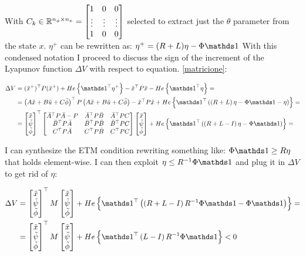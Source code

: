 \documentclass{article}
\begin{document}
With $C_{k} \in {\mathbb{R}}^{n_{\phi} \times n_{x}} = \left[\begin{matrix}
  1 & 0 & 0 \\
  \vdots & \vdots & \vdots \\
  1 & 0 & 0 
\end{matrix}\right]$ selected to extract just the $\theta$ parameter from the state $x$.
$\eta^{+}$ can be rewritten as: $\eta^{+} = (R + L) \eta - \Phi \one$
With this condensed notation I proceed to discuss the sign of the increment of the Lyapunov function $\Delta V$ with respect to equation. \ref{matricione}:

\begin{align*}
  \Delta V &= (\tilde{x}^{+})\tr P (\tilde{x}^{+}) + He\left\{ \one\tr \eta^{+} \right\} - \tilde{x}\tr P \tilde{x} - He\left\{ \one\tr \eta \right\} =\\
  &= \left( A \tilde{x} + B \tilde{u} + C \tilde{\phi} \right)\tr P \left( A \tilde{x} + B \tilde{u} + C \tilde{\phi} \right) - \tilde{x}\tr P \tilde{x} + He\left\{ \one\tr \left(   \left( R + L \right)\eta - \Phi \one - \eta  \right) \right\} = \\
  &= \bmx{
    \tilde{x}\\
    \tilde{\psi}\\
    \tilde{\phi}
  }\tr \bmx{
    \bar{A}\tr P \bar{A} - P & \bar{A}\tr P \bar{B} & \bar{A}\tr P C \\
    \bar{B}\tr P \bar{A} & \bar{B}\tr P \bar{B} & \bar{B}\tr P C \\
    C\tr P \bar{A} & C\tr P \bar{B} & C\tr P C
  } \bmx{
    \tilde{x}\\
    \tilde{\psi}\\
    \tilde{\phi}
  } + He\left\{ \one\tr \left( \left( R + L - I \right) \eta - \Phi \one \right) \right\} =
\end{align*}

I can synthesize the ETM condition rewriting something like: $\Phi \one \geq R \eta$ that holds element-wise. I can then exploit $\eta \leq R^{-1} \Phi \one$ and plug it in $\Delta V$ to get rid of $\eta$:

\begin{align*}
  \Delta V &= \bmx{
    \tilde{x}\\
    \tilde{\psi}\\
    \tilde{\phi}
  }\tr M \bmx{
    \tilde{x}\\
    \tilde{\psi}\\
    \tilde{\phi}
  } + He\left\{ \one\tr \left( \left( R + L - I \right) R^{-1} \Phi \one - \Phi \one \right) \right\} = \\
  &= \bmx{
    \tilde{x}\\
    \tilde{\psi}\\
    \tilde{\phi}
  }\tr M \bmx{
    \tilde{x}\\
    \tilde{\psi}\\
    \tilde{\phi}
  } + He\left\{ \one\tr \left( L - I \right) R^{-1} \Phi \one \right\} < 0
\end{align*}
\end{document}
